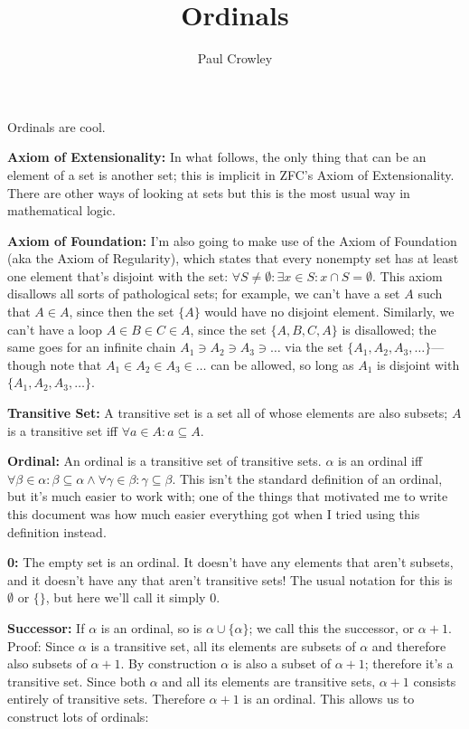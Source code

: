 \documentclass{article}
\title{Ordinals}
\author{Paul Crowley}
\begin{document}
\maketitle
Ordinals are cool.

\textbf{Axiom of Extensionality:} In what follows, the only thing that can be an element of a set is another set; this is implicit in ZFC's Axiom of Extensionality. There are other ways of looking at sets but this is the most usual way in mathematical logic.

\textbf{Axiom of Foundation:} I'm also going to make use of the Axiom of Foundation (aka the Axiom of Regularity), which states that every nonempty set has at least one element that's disjoint with the set: $\forall S \neq \emptyset:  \exists x \in S: x \cap S = \emptyset$. This axiom disallows all sorts of pathological sets; for example, we can't have a set $A$ such that $A \in A$, since then the set $\{A\}$ would have no disjoint element. Similarly, we can't have a loop $A \in B \in C \in A$, since the set $\{A, B, C, A\}$ is disallowed; the same goes for an infinite chain $A_1 \ni A_2 \ni A_3 \ni \ldots$ via the set $\{A_1, A_2, A_3, \ldots\}$---though note that $A_1 \in A_2 \in A_3 \in \ldots$ can be allowed, so long as $A_1$ is disjoint with $\{A_1, A_2, A_3, \ldots\}$.

\textbf{Transitive Set:} A transitive set is a set all of whose elements are also subsets; $A$ is a transitive set iff $\forall a \in A: a \subseteq A$.

\textbf{Ordinal:} An ordinal is a transitive set of transitive sets. $\alpha$ is an ordinal iff $\forall \beta \in \alpha: \beta \subseteq \alpha \wedge \forall \gamma \in \beta: \gamma \subseteq \beta$. This isn't the standard definition of an ordinal, but it's much easier to work with; one of the things that motivated me to write this document was how much easier everything got when I tried using this definition instead.

\textbf{0:} The empty set is an ordinal. It doesn't have any elements that aren't subsets, and it doesn't have any that aren't transitive sets! The usual notation for this is $\emptyset$ or $\{\}$, but here we'll call it simply 0.

\textbf{Successor:} If $\alpha$ is an ordinal, so is $\alpha \cup \{\alpha\}$; we call this the successor, or $\alpha + 1$. Proof: Since $\alpha$ is a transitive set, all its elements are subsets of $\alpha$ and therefore also subsets of $\alpha + 1$. By construction $\alpha$ is also a subset of $\alpha + 1$; therefore it's a transitive set. Since both $\alpha$ and all its elements are transitive sets, $\alpha + 1$ consists entirely of transitive sets. Therefore $\alpha + 1$ is an ordinal. This allows us to construct lots of ordinals:
\end{document}
